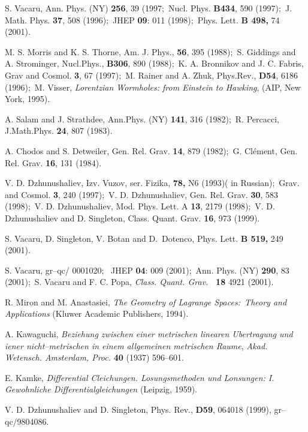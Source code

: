 \documentclass[a4paper,preprint,prabib,aps]{revtex4}
\begin{document}
\begin{references}

  S. Vacaru, Ann. Phys. (NY) {\bf 256}, 39 (1997;\
Nucl. Phys. {\bf B434}, 590 (1997);\ J. Math. Phys. {\bf 37}, 508
(1996);\ JHEP {\bf 09}: 011 (1998);\ Phys. Lett. {\bf B 498,} 74
(2001).

  M. S. Morris and K. S. Thorne, Am. J. Phys., {\bf 56}, 395
(1988);\ S. Giddings and A. Strominger, Nucl.Phys., {\bf B306}, 890 (1988);\
K. A. Bronnikov and J. C. Fabris, Grav and Cosmol. {\bf 3}, 67 (1997);\ M.
Rainer and A. Zhuk, Phys.Rev., {\bf D54}, 6186 (1996);\ M. Visser, {\it 
Lorentzian Wormholes: from Einstein to Hawking}, (AIP, New York, 1995).

\bibitem{sal}  A. Salam and J. Strathdee, Ann.Phys. (NY) {\bf 141}, 316
(1982);\ R. Percacci, J.Math.Phys. {\bf 24}, 807 (1983).

  A. Chodos and S. Detweiler, Gen. Rel. Grav. {\bf 14}, 879
(1982);\ G. Cl\'{e}ment, Gen. Rel. Grav. {\bf 16}, 131 (1984).\

\bibitem{dzhsin}  V. D. Dzhunushaliev, Izv. Vuzov, ser. Fizika, {\bf 78,} N6
(1993)( in Russian);\ Grav. and Cosmol. {\bf 3}, 240 (1997);\ V. D.
Dzhunushaliev, Gen. Rel. Grav. {\bf 30}, 583 (1998);\ V. D. Dzhunushaliev,
Mod. Phys. Lett. A {\bf 13}, 2179 (1998);\ V. D. Dzhunushaliev and D.
Singleton, Class. Quant. Grav. {\bf 16}, 973 (1999).

  S. Vacaru, D. Singleton, V. Botan and D.\ Dotenco, Phys.
Lett. {\bf B 519,} 249 (2001).

  S. Vacaru, gr--qc/ 0001020; \ JHEP {\bf 04}: 009 (2001);\
Ann. Phys. (NY) {\bf 290}, 83 (2001);\ S. Vacaru and F. C. Popa,
{\sl Class. Quant. Grav.} {\bf \ 18 } 4921 (2001).

\bibitem{miron} R. Miron and M. Anastasiei, {\it The Geometry of Lagrange
Spaces:\ Theory and Applications} (Kluwer Academic Publishers, 1994).

\bibitem{kawaguchi} A. Kawaguchi, {\it Beziehung zwischen einer
metrischen linearen Ubertragung und iener nicht--metrischen in
einem allgemeinen metrischen Raume}, {\sl Akad. Wetensch.
Amsterdam, Proc.} {\bf 40} (1937) 596--601.

\bibitem{kamke}  E. Kamke, {\it Differential Cleichungen. Losungsmethoden
und Lonsungen: I. Gewohnliche Differentialgleichungen} (Leipzig, 1959).

\bibitem{ds}  V. D. Dzhunushaliev and D. Singleton, Phys. Rev., {\bf D59},
064018 (1999), gr--qc/9804086.


\end{references}
\end{document}
